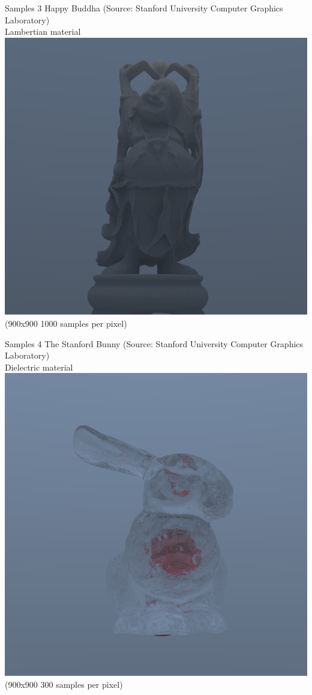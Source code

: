 \documentclass{beamer}
\begin{document}
\begin{frame} {Samples 3}
\normalsize Happy Buddha \tiny (Source: Stanford University Computer Graphics Laboratory) \\
\normalsize Lambertian material \\
\includegraphics[scale=0.18]{buda.png}
\tiny (900x900 1000 samples per pixel) \\
\end{frame}

\label{section2}
\begin{frame} {Samples 4}
\normalsize The Stanford Bunny \tiny (Source: Stanford University Computer Graphics Laboratory) \\
\normalsize Dielectric material \\
\includegraphics[scale=0.18]{glassbunny.png}
\tiny (900x900 300 samples per pixel) \\
\end{frame}
\end{document}
